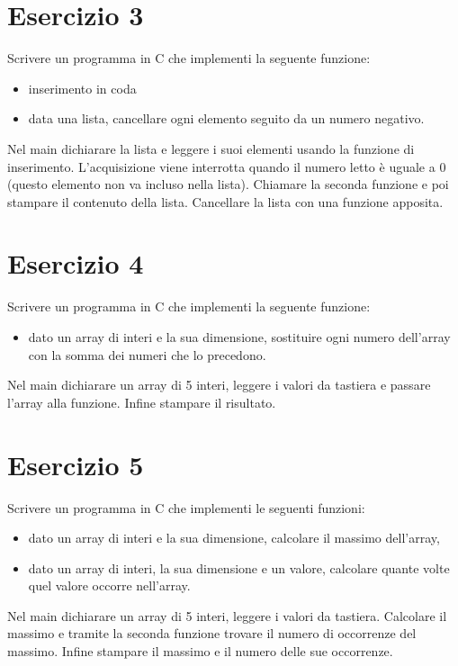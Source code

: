 \documentclass[italian,oneside,headinclude,10pt]{scrartcl}
\begin{document}
\section{Esercizio 3}
Scrivere un programma in C che implementi la seguente funzione:
\begin{itemize}
    \item inserimento in coda
    \item data una lista, cancellare ogni elemento seguito da un numero negativo.
\end{itemize}

Nel main dichiarare la lista e leggere i suoi elementi usando la funzione di inserimento. L'acquisizione viene interrotta quando il numero letto è uguale a $0$ (questo elemento non va incluso nella lista). Chiamare la seconda funzione e poi stampare il contenuto della lista. Cancellare la lista con una funzione apposita.

\section{Esercizio 4}
Scrivere un programma in C che implementi la seguente funzione:
\begin{itemize}
    \item dato un array di interi e la sua dimensione, sostituire ogni numero dell'array con la somma dei numeri che lo precedono.
\end{itemize}

Nel main dichiarare un array di 5 interi, leggere i valori da tastiera e passare l'array alla funzione. Infine stampare il risultato.

\section{Esercizio 5}
Scrivere un programma in C che implementi le seguenti funzioni:
\begin{itemize}
    \item dato un array di interi e la sua dimensione, calcolare il massimo dell'array,
    \item dato un array di interi, la sua dimensione e un valore, calcolare quante volte quel valore occorre nell'array.
\end{itemize}

Nel main dichiarare un array di 5 interi, leggere i valori da tastiera. Calcolare il massimo e tramite la seconda funzione trovare il numero di occorrenze del massimo. Infine stampare il massimo e il numero delle sue occorrenze.
\end{document}
